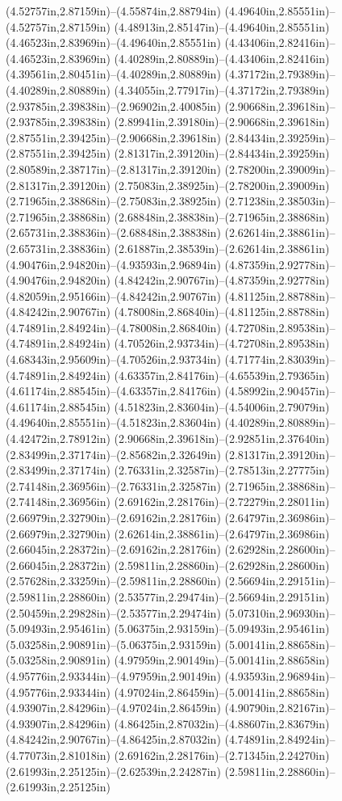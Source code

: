 (4.52757in,2.87159in)--(4.55874in,2.88794in) (4.49640in,2.85551in)--(4.52757in,2.87159in) (4.48913in,2.85147in)--(4.49640in,2.85551in) (4.46523in,2.83969in)--(4.49640in,2.85551in) (4.43406in,2.82416in)--(4.46523in,2.83969in) (4.40289in,2.80889in)--(4.43406in,2.82416in) (4.39561in,2.80451in)--(4.40289in,2.80889in) (4.37172in,2.79389in)--(4.40289in,2.80889in) (4.34055in,2.77917in)--(4.37172in,2.79389in) (2.93785in,2.39838in)--(2.96902in,2.40085in) (2.90668in,2.39618in)--(2.93785in,2.39838in) (2.89941in,2.39180in)--(2.90668in,2.39618in) (2.87551in,2.39425in)--(2.90668in,2.39618in) (2.84434in,2.39259in)--(2.87551in,2.39425in) (2.81317in,2.39120in)--(2.84434in,2.39259in) (2.80589in,2.38717in)--(2.81317in,2.39120in) (2.78200in,2.39009in)--(2.81317in,2.39120in) (2.75083in,2.38925in)--(2.78200in,2.39009in) (2.71965in,2.38868in)--(2.75083in,2.38925in) (2.71238in,2.38503in)--(2.71965in,2.38868in) (2.68848in,2.38838in)--(2.71965in,2.38868in) (2.65731in,2.38836in)--(2.68848in,2.38838in) (2.62614in,2.38861in)--(2.65731in,2.38836in) (2.61887in,2.38539in)--(2.62614in,2.38861in) (4.90476in,2.94820in)--(4.93593in,2.96894in) (4.87359in,2.92778in)--(4.90476in,2.94820in) (4.84242in,2.90767in)--(4.87359in,2.92778in) (4.82059in,2.95166in)--(4.84242in,2.90767in) (4.81125in,2.88788in)--(4.84242in,2.90767in) (4.78008in,2.86840in)--(4.81125in,2.88788in) (4.74891in,2.84924in)--(4.78008in,2.86840in) (4.72708in,2.89538in)--(4.74891in,2.84924in) (4.70526in,2.93734in)--(4.72708in,2.89538in) (4.68343in,2.95609in)--(4.70526in,2.93734in) (4.71774in,2.83039in)--(4.74891in,2.84924in) (4.63357in,2.84176in)--(4.65539in,2.79365in) (4.61174in,2.88545in)--(4.63357in,2.84176in) (4.58992in,2.90457in)--(4.61174in,2.88545in) (4.51823in,2.83604in)--(4.54006in,2.79079in) (4.49640in,2.85551in)--(4.51823in,2.83604in) (4.40289in,2.80889in)--(4.42472in,2.78912in) (2.90668in,2.39618in)--(2.92851in,2.37640in) (2.83499in,2.37174in)--(2.85682in,2.32649in) (2.81317in,2.39120in)--(2.83499in,2.37174in) (2.76331in,2.32587in)--(2.78513in,2.27775in) (2.74148in,2.36956in)--(2.76331in,2.32587in) (2.71965in,2.38868in)--(2.74148in,2.36956in) (2.69162in,2.28176in)--(2.72279in,2.28011in) (2.66979in,2.32790in)--(2.69162in,2.28176in) (2.64797in,2.36986in)--(2.66979in,2.32790in) (2.62614in,2.38861in)--(2.64797in,2.36986in) (2.66045in,2.28372in)--(2.69162in,2.28176in) (2.62928in,2.28600in)--(2.66045in,2.28372in) (2.59811in,2.28860in)--(2.62928in,2.28600in) (2.57628in,2.33259in)--(2.59811in,2.28860in) (2.56694in,2.29151in)--(2.59811in,2.28860in) (2.53577in,2.29474in)--(2.56694in,2.29151in) (2.50459in,2.29828in)--(2.53577in,2.29474in) (5.07310in,2.96930in)--(5.09493in,2.95461in) (5.06375in,2.93159in)--(5.09493in,2.95461in) (5.03258in,2.90891in)--(5.06375in,2.93159in) (5.00141in,2.88658in)--(5.03258in,2.90891in) (4.97959in,2.90149in)--(5.00141in,2.88658in) (4.95776in,2.93344in)--(4.97959in,2.90149in) (4.93593in,2.96894in)--(4.95776in,2.93344in) (4.97024in,2.86459in)--(5.00141in,2.88658in) (4.93907in,2.84296in)--(4.97024in,2.86459in) (4.90790in,2.82167in)--(4.93907in,2.84296in) (4.86425in,2.87032in)--(4.88607in,2.83679in) (4.84242in,2.90767in)--(4.86425in,2.87032in) (4.74891in,2.84924in)--(4.77073in,2.81018in) (2.69162in,2.28176in)--(2.71345in,2.24270in) (2.61993in,2.25125in)--(2.62539in,2.24287in) (2.59811in,2.28860in)--(2.61993in,2.25125in) 